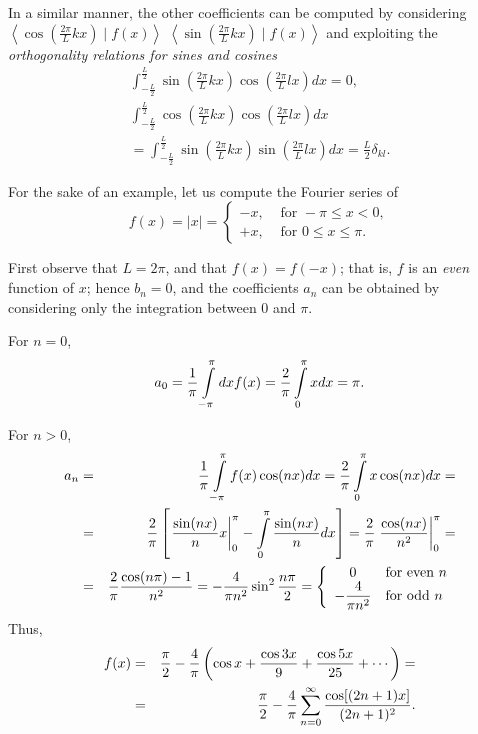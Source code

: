 {In a similar manner, the other coefficients can be computed by considering
$\left\langle   \cos \left(\frac{2\pi }{L}kx\right)  \mid f(x) \right\rangle$
$\left\langle   \sin \left(\frac{2\pi }{L}kx\right)  \mid f(x) \right\rangle$
and exploiting the
{\em orthogonality relations for sines and cosines}
\begin{equation}
\begin{split}
\int_{-\frac{L}{2}}^\frac{L}{2}
\sin\left(\frac{2\pi }{L}kx\right)
\cos\left(\frac{2\pi }{L}lx\right)
dx
=0,\\
\int_{-\frac{L}{2}}^\frac{L}{2}
\cos\left(\frac{2\pi }{L}kx\right)
\cos\left(\frac{2\pi }{L}lx\right)
dx
\\
=
\int_{-\frac{L}{2}}^\frac{L}{2}
\sin\left(\frac{2\pi }{L}kx\right)
\sin\left(\frac{2\pi }{L}lx\right)
dx
=\frac{L}{2}\delta_{kl}.
\end{split}
\label{2012-m-ch-orsc}
\end{equation}



\eproof
}

{
\color{blue}
\bexample
For the sake of an example, let us compute the  Fourier series of
$$
f(x)=\vert x\vert
=
\begin{cases}
 -x, & \textrm{ for }  -\pi \le x<0 ,\\
 +x, & \textrm{ for }  0\le x\le \pi  .
\end{cases}
$$

First observe that $L=2\pi$, and that
$f(x)=f(-x)$; that is, $f$ is an {\em even} function of $x$;
hence
$b_n=0$, and the coefficients $a_n$ can be obtained by considering only the integration
between $0$ and $\pi$.

For $n=0$,
$$a_0={1\over\pi}\int\limits_{-\pi}^\pi dxf(x)={2\over\pi}
\int\limits_0^\pi xdx=\pi.$$

For $n>0$,
\begin{eqnarray*}
   a_n&=&{1\over\pi}\int\limits_{-\pi}^\pi f(x)\cos(nx)dx=
         {2\over\pi}\int\limits_0^\pi x\cos(nx)dx=\\
      &=&{2\over\pi}\left[\left.{\sin(nx)\over n}x\right|_0^\pi-
         \int\limits_0^\pi{\sin(nx)\over n}dx\right]={2\over\pi}\left.
         {\cos(nx)\over n^2}\right|_0^\pi=\\
      &=&{2\over\pi}{\cos(n\pi)-1\over n^2}=-{4\over\pi n^2}\sin^2{n\pi\over2}=
         \left\{\begin{array}{cl}
              0&\mbox{for even $n$}\\
              \displaystyle-{4\over\pi n^2}&\mbox{for odd $n$}
              \end{array}\right.
\end{eqnarray*}
Thus,
\begin{eqnarray*}
    f(x)&=&{\pi\over2}-{4\over\pi}\left(\cos x+
               {\cos 3x\over9}+{\cos 5x\over 25}+\cdots\right)=\\
            &=&{\pi\over2}-{4\over\pi}\sum_{n=0}^\infty
               {\cos[(2n+1)x]\over(2n+1)^2}.
\end{eqnarray*}

\eexample
}

